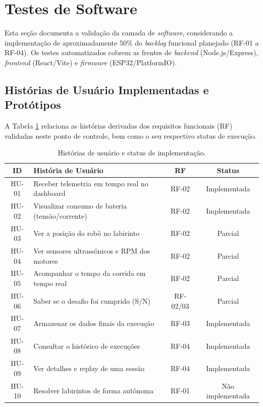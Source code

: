 \section{Testes de Software}

Esta seção documenta a validação da camada de \textit{software}, considerando a implementação de aproximadamente $50\%$ do \textit{backlog} funcional planejado (RF-01 a RF-04). Os testes automatizados cobrem as frentes de \textit{backend} (Node.js/Express), \textit{frontend} (React/Vite) e \textit{firmware} (ESP32/PlatformIO).

\subsection{Histórias de Usuário Implementadas e Protótipos}
A Tabela \ref{tab:historias-usuario} relaciona as histórias derivadas dos requisitos funcionais (RF) validadas neste ponto de controle, bem como o seu respectivo status de execução.

\begin{table}[H]
\centering
\small
\renewcommand{\arraystretch}{1.2}
\caption{Histórias de usuário e status de implementação.}
\label{tab:historias-usuario}
\begin{tabularx}{\linewidth}{|c|X|c|c|}
\hline
\textbf{ID} & \textbf{História de Usuário} & \textbf{RF} & \textbf{Status} \\ \hline
HU-01 & Receber telemetria em tempo real no dashboard & RF-02 & Implementada \\ \hline
HU-02 & Visualizar consumo de bateria (tensão/corrente) & RF-02 & Implementada \\ \hline
HU-03 & Ver a posição do robô no labirinto & RF-02 & Parcial \\ \hline
HU-04 & Ver sensores ultrassônicos e RPM dos motores & RF-02 & Parcial \\ \hline
HU-05 & Acompanhar o tempo da corrida em tempo real & RF-02 & Parcial \\ \hline
HU-06 & Saber se o desafio foi cumprido (S/N) & RF-02/03 & Parcial \\ \hline
HU-07 & Armazenar os dados finais da execução & RF-03 & Implementada \\ \hline
HU-08 & Consultar o histórico de execuções & RF-04 & Implementada \\ \hline
HU-09 & Ver detalhes e replay de uma sessão & RF-04 & Implementada \\ \hline
HU-10 & Resolver labirintos de forma autônoma & RF-01 & Não implementada \\ \hline
\end{tabularx}
\end{table}

